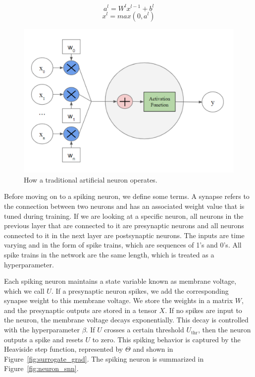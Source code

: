 \documentclass [MS] {UCLAthesis}
\begin{document}
$$ a^l =  W^l x^{l-1} + b^l $$
$$ x^l = max(0, a^l) $$

\begin{figure}
    \centering
    \includegraphics[width=\textwidth]{neuron_ann}
    \caption[Artificial neuron model]{How a traditional artificial neuron operates.}
    \label{fig:neuron_ann}
\end{figure}

Before moving on to a spiking neuron, we define some terms. A synapse refers to the connection between two neurons and has an associated weight value that is tuned during training. If we are looking at a specific neuron, all neurons in the previous layer that are connected to it are presynaptic neurons and all neurons connected to it in the next layer are postsynaptic neurons. The inputs are time varying and in the form of spike trains, which are sequences of 1's and 0's. All spike trains in the network are the same length, which is treated as a hyperparameter.

Each spiking neuron maintains a state variable known as membrane voltage, which we call $U$. If a presynaptic neuron spikes, we add the corresponding synapse weight to this membrane voltage. We store the weights in a matrix $W$, and the presynaptic outputs are stored in a tensor $X$. If no spikes are input to the neuron, the membrane voltage decays exponentially. This decay is controlled with the hyperparameter $\beta$. If $U$ crosses a certain threshold $U_\text{thr}$, then the neuron outputs a spike and resets $U$ to zero. This spiking behavior is captured by the Heaviside step function, represented by $\Theta$ and shown in Figure~\ref{fig:surrogate_grad}. The spiking neuron is summarized in Figure~\ref{fig:neuron_snn}.
\end{document}
